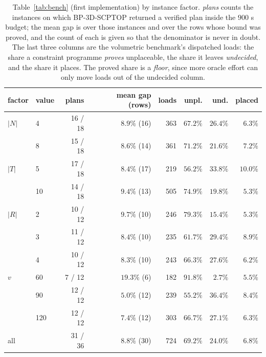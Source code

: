 \begin{table}[!htbp]
\centering
\small
\caption{Table~\ref{tab:bench} (first implementation) by instance
factor. \emph{plans} counts
the instances on which BP-3D-SCPTOP returned a verified plan inside the
$900$ s budget; the mean gap is over those instances and over the rows
whose bound was proved, and the count of each is given so that the
denominator is never in doubt. The last three columns are the
volumetric benchmark's dispatched loads: the share a constraint
programme \emph{proves} unplaceable, the share it leaves
\emph{undecided}, and the share it places. The proved share is a
\emph{floor}, since more oracle effort can only move loads out of the
undecided column.}
\label{tab:summary}
\begin{tabular}{llrrrrrr}
\toprule
factor & value & plans & mean gap (rows) & loads & unpl. & und. & placed \\
\midrule
$|N|$ & 4 & 16 / 18 & $8.9\%$ (16) & 363 & $67.2\%$ & $26.4\%$ & $6.3\%$ \\
 & 8 & 15 / 18 & $8.6\%$ (14) & 361 & $71.2\%$ & $21.6\%$ & $7.2\%$ \\
\midrule
$|T|$ & 5 & 17 / 18 & $8.4\%$ (17) & 219 & $56.2\%$ & $33.8\%$ & $10.0\%$ \\
 & 10 & 14 / 18 & $9.4\%$ (13) & 505 & $74.9\%$ & $19.8\%$ & $5.3\%$ \\
\midrule
$|R|$ & 2 & 10 / 12 & $9.7\%$ (10) & 246 & $79.3\%$ & $15.4\%$ & $5.3\%$ \\
 & 3 & 11 / 12 & $8.4\%$ (10) & 235 & $61.7\%$ & $29.4\%$ & $8.9\%$ \\
 & 4 & 10 / 12 & $8.3\%$ (10) & 243 & $66.3\%$ & $27.6\%$ & $6.2\%$ \\
\midrule
$v$ & 60 & 7 / 12 & $19.3\%$ (6) & 182 & $91.8\%$ & $2.7\%$ & $5.5\%$ \\
 & 90 & 12 / 12 & $5.0\%$ (12) & 239 & $55.2\%$ & $36.4\%$ & $8.4\%$ \\
 & 120 & 12 / 12 & $7.4\%$ (12) & 303 & $66.7\%$ & $27.1\%$ & $6.3\%$ \\
\midrule
all & & 31 / 36 & $8.8\%$ (30) & 724 & $\mathbf{69.2\%}$ & $24.0\%$ & $6.8\%$ \\
\bottomrule
\end{tabular}
\end{table}
